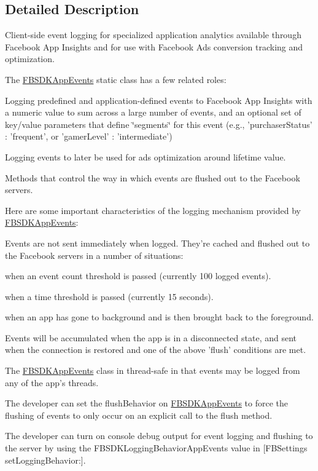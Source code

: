\subsection{Detailed Description}
Client-\/side event logging for specialized application analytics available through Facebook App Insights and for use with Facebook Ads conversion tracking and optimization.

The {\ttfamily \hyperlink{interface_f_b_s_d_k_app_events}{F\-B\-S\-D\-K\-App\-Events}} static class has a few related roles\-:


\begin{DoxyItemize}
\item Logging predefined and application-\/defined events to Facebook App Insights with a numeric value to sum across a large number of events, and an optional set of key/value parameters that define \char`\"{}segments\char`\"{} for this event (e.\-g., 'purchaser\-Status' \-: 'frequent', or 'gamer\-Level' \-: 'intermediate')
\item Logging events to later be used for ads optimization around lifetime value.
\item Methods that control the way in which events are flushed out to the Facebook servers.
\end{DoxyItemize}

Here are some important characteristics of the logging mechanism provided by {\ttfamily \hyperlink{interface_f_b_s_d_k_app_events}{F\-B\-S\-D\-K\-App\-Events}}\-:


\begin{DoxyItemize}
\item Events are not sent immediately when logged. They're cached and flushed out to the Facebook servers in a number of situations\-:
\item when an event count threshold is passed (currently 100 logged events).
\item when a time threshold is passed (currently 15 seconds).
\item when an app has gone to background and is then brought back to the foreground.
\item Events will be accumulated when the app is in a disconnected state, and sent when the connection is restored and one of the above 'flush' conditions are met.
\item The {\ttfamily \hyperlink{interface_f_b_s_d_k_app_events}{F\-B\-S\-D\-K\-App\-Events}} class in thread-\/safe in that events may be logged from any of the app's threads.
\item The developer can set the {\ttfamily flush\-Behavior} on {\ttfamily \hyperlink{interface_f_b_s_d_k_app_events}{F\-B\-S\-D\-K\-App\-Events}} to force the flushing of events to only occur on an explicit call to the {\ttfamily flush} method.
\item The developer can turn on console debug output for event logging and flushing to the server by using the {\ttfamily F\-B\-S\-D\-K\-Logging\-Behavior\-App\-Events} value in {\ttfamily \mbox{[}F\-B\-Settings set\-Logging\-Behavior\-:\mbox{]}}.
\end{DoxyItemize}

